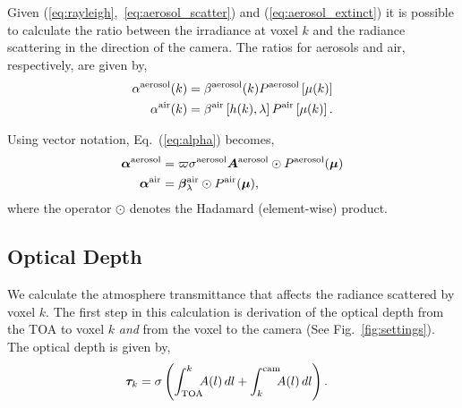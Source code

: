 \documentclass[10pt,twocolumn,letterpaper]{article}
\newcommand{\vect}[1]{\bm{#1}}
\newcommand{\mat}[1]{\bm{#1}}
\newcommand{\derivsym}[1]{\,d{#1}}
\begin{document}
Given (\ref{eq:rayleigh},~\ref{eq:aerosol_scatter}) and
(\ref{eq:aerosol_extinct}) it is possible to calculate the ratio
between the irradiance at voxel $k$ and the radiance scattering in the
direction of the camera. The ratios for aerosols and air,
respectively, are given by,
\begin{align}
  \alpha^{\rm aerosol}(k) &= \beta^{\rm aerosol}(k) P^{\rm aerosol}\left[\mu(k)\right] \nonumber \\
  \alpha^{\rm air}(k) &= \beta^{\rm air}\left[h(k), \lambda \right]
  P^{\rm air}\left[\mu(k)\right].
  \label{eq:alpha}
\end{align}

\noindent Using vector notation, Eq.~(\ref{eq:alpha}) becomes,
\begin{align}
  \vect{\alpha}^{\rm aerosol} &= \varpi \sigma^{\rm aerosol}
  \mat{A}^{\rm
    aerosol} \odot P^{\rm aerosol}(\vect{\mu}) \nonumber \\
  \vect{\alpha}^{\rm air} &= \vect{\beta}^{\rm air}_{\lambda} \odot
  P^{\rm air}(\vect{\mu}),
  \label{eq:alpha_matrix}
\end{align}
where the operator $\odot$ denotes the Hadamard (element-wise)
product.

\subsection{Optical Depth}
\label{sec:optical-depth}

We calculate the atmosphere transmittance that affects the radiance
scattered by voxel $k$.  The first step in this calculation is
derivation of the optical depth from the TOA to voxel $k$ \emph{and}
from the voxel to the camera (See Fig.~\ref{fig:settings}). The
optical depth is given by,
\begin{align}
  \vect{\tau}_{k} &= \sigma \left( \int_{\rm
      TOA}^{k}\!\!\!A(l)\derivsym{l} + \int_{k}^{\rm cam}\!\!\!A(l)
    \derivsym{l} \right).
  \label{eq:optical_depth}
\end{align}
\end{document}
